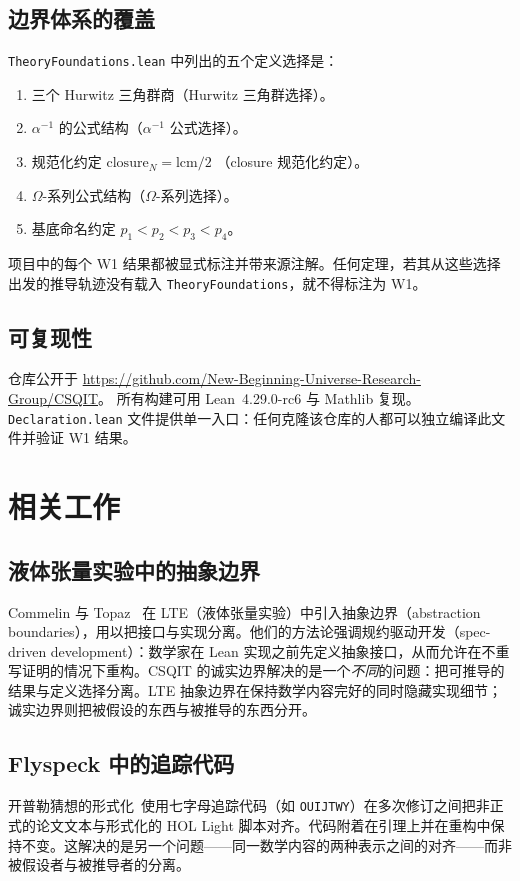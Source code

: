 \documentclass[11pt]{ctexart}
\begin{document}
\subsection{边界体系的覆盖}
\texttt{TheoryFoundations.lean} 中列出的五个定义选择是：
\begin{enumerate}
\item 三个 Hurwitz 三角群商（Hurwitz 三角群选择）。
\item $\alpha^{-1}$ 的公式结构（$\alpha^{-1}$ 公式选择）。
\item 规范化约定 $\mathrm{closure}_N = \mathrm{lcm}/2$
  （closure 规范化约定）。
\item $\Omega$-系列公式结构（$\Omega$-系列选择）。
\item 基底命名约定 $p_1 < p_2 < p_3 < p_4$。
\end{enumerate}
项目中的每个 W1 结果都被显式标注并带来源注解。任何定理，若其从这些选择出发的推导轨迹没有载入 \texttt{TheoryFoundations}，就不得标注为 W1。

\subsection{可复现性}
仓库公开于
\url{https://github.com/New-Beginning-Universe-Research-Group/CSQIT}。
所有构建可用 Lean~4.29.0-rc6 与 Mathlib 复现。
\texttt{Declaration.lean} 文件提供单一入口：任何克隆该仓库的人都可以独立编译此文件并验证 W1 结果。

\section{相关工作}
\label{sec:related}

\subsection{液体张量实验中的抽象边界}
Commelin 与 Topaz~\cite{commelin2023} 在 LTE（液体张量实验）中引入抽象边界（abstraction boundaries），用以把接口与实现分离。他们的方法论强调规约驱动开发（spec-driven development）：数学家在 Lean 实现之前先定义抽象接口，从而允许在不重写证明的情况下重构。CSQIT 的诚实边界解决的是一个\emph{不同}的问题：把可推导的结果与定义选择分离。LTE 抽象边界在保持数学内容完好的同时隐藏实现细节；诚实边界则把被假设的东西与被推导的东西分开。

\subsection{Flyspeck 中的追踪代码}
开普勒猜想的形式化~\cite{hales2017}使用七字母追踪代码（如 \texttt{OUIJTWY}）在多次修订之间把非正式的论文文本与形式化的 HOL Light 脚本对齐。代码附着在引理上并在重构中保持不变。这解决的是另一个问题——同一数学内容的两种表示之间的对齐——而非被假设者与被推导者的分离。
\end{document}
